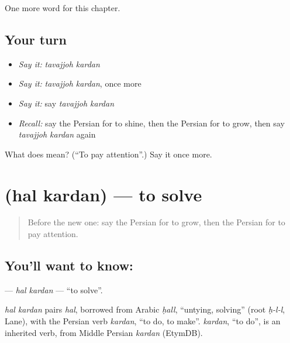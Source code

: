 \begin{grammarlens}[title={What you've built}]
One more word for this chapter.
\end{grammarlens}

\subsection*{Your turn}
\begin{itemize}
\raggedright
  \item \emph{Say it:} \emph{tavajjoh kardan}
  \item \emph{Say it:} \emph{tavajjoh kardan}, once more
  \item \emph{Say it:} say \emph{tavajjoh kardan}
  \item \emph{Recall:} say the Persian for to shine, then the Persian for to grow, then say \emph{tavajjoh kardan} again
\end{itemize}

\begin{tcolorbox}[breakable,colback=teal!4,colframe=teal!35!black,title={Before you move on}]
What does   mean? (\textquotedblleft{}To pay attention\textquotedblright{}.) Say it once more.
\end{tcolorbox}
\section[\texorpdfstring{\fa{حل} \fa{کردن} (hal kardan)}{حل کردن (hal kardan)}]{  (hal kardan) — to solve}

\label{lesson:FA-C185-hal-kardan}



\begin{quote}
Before the new one: say the Persian for to grow, then the Persian for to pay attention.
\end{quote}

\subsection*{You'll want to know:  }
\textbf{ } — \emph{hal kardan} — \textquotedblleft{}to solve\textquotedblright{}.

\begin{cousinweb}
\emph{hal kardan} pairs \emph{hal}, borrowed from Arabic \emph{ḥall}, \textquotedblleft{}untying, solving\textquotedblright{} (root \emph{ḥ-l-l}, Lane), with the Persian verb \emph{kardan}, \textquotedblleft{}to do, to make\textquotedblright{}. \emph{kardan}, \textquotedblleft{}to do\textquotedblright{}, is an inherited verb, from Middle Persian \emph{kardan} (EtymDB).
\end{cousinweb}


